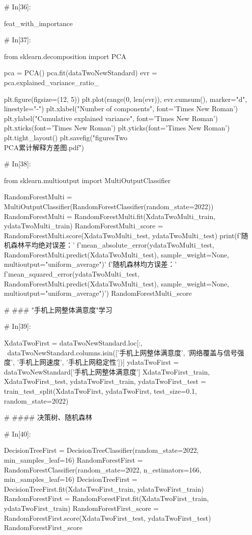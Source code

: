 \documentclass{MathorCupmodeling}
\begin{document}
\begin{python}
	# In[36]:
	
	
	feat_with_importance
	
	# In[37]:
	
	
	from sklearn.decomposition import PCA
	
	pca = PCA()
	pca.fit(dataTwoNewStandard)
	evr = pca.explained_variance_ratio_
	
	plt.figure(figsize=(12, 5))
	plt.plot(range(0, len(evr)), evr.cumsum(), marker="d", linestyle="-")
	plt.xlabel("Number of components", font='Times New Roman')
	plt.ylabel("Cumulative explained variance", font='Times New Roman')
	plt.xticks(font='Times New Roman')
	plt.yticks(font='Times New Roman')
	plt.tight_layout()
	plt.savefig("figuresTwo\\[附件2]PCA累计解释方差图.pdf")
	
	# In[38]:
	
	
	from sklearn.multioutput import MultiOutputClassifier
	
	RandomForestMulti = MultiOutputClassifier(RandomForestClassifier(random_state=2022))
	RandomForestMulti = RandomForestMulti.fit(XdataTwoMulti_train, ydataTwoMulti_train)
	RandomForestMulti_score = RandomForestMulti.score(XdataTwoMulti_test, ydataTwoMulti_test)
	print(f'随机森林平均绝对误差：'
		  f'{mean_absolute_error(ydataTwoMulti_test, RandomForestMulti.predict(XdataTwoMulti_test), sample_weight=None, multioutput="uniform_average")}\n'
		  f'随机森林均方误差：'
		  f'{mean_squared_error(ydataTwoMulti_test, RandomForestMulti.predict(XdataTwoMulti_test), sample_weight=None, multioutput="uniform_average")}')
	RandomForestMulti_score
	
	# ### "手机上网整体满意度"学习
	
	# In[39]:
	
	
	XdataTwoFirst = dataTwoNewStandard.loc[:, ~dataTwoNewStandard.columns.isin(['手机上网整体满意度', '网络覆盖与信号强度', '手机上网速度', '手机上网稳定性'])]
	ydataTwoFirst = dataTwoNewStandard['手机上网整体满意度']
	XdataTwoFirst_train, XdataTwoFirst_test, ydataTwoFirst_train, ydataTwoFirst_test = train_test_split(XdataTwoFirst, ydataTwoFirst, test_size=0.1, random_state=2022)
	
	# #### 决策树、随机森林
	
	# In[40]:
	
	
	DecisionTreeFirst = DecisionTreeClassifier(random_state=2022, min_samples_leaf=16)
	RandomForestFirst = RandomForestClassifier(random_state=2022, n_estimators=166, min_samples_leaf=16)
	DecisionTreeFirst = DecisionTreeFirst.fit(XdataTwoFirst_train, ydataTwoFirst_train)
	RandomForestFirst = RandomForestFirst.fit(XdataTwoFirst_train, ydataTwoFirst_train)
	RandomForestFirst_score = RandomForestFirst.score(XdataTwoFirst_test, ydataTwoFirst_test)
	RandomForestFirst_score
	

\end{python}
\end{document}
